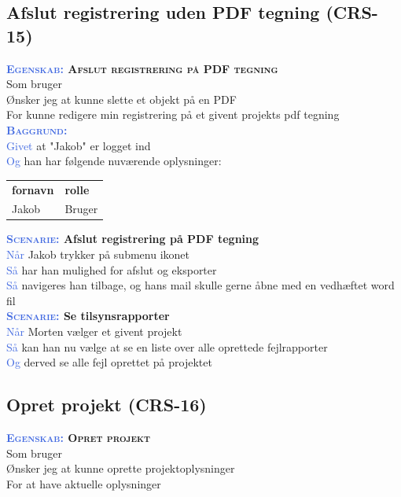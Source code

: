 \subsection{Afslut registrering uden PDF tegning (CRS-15)} \label{sec:USAfslutRegUdenPDF}
\textbf{\textsc{\textcolor{RoyalBlue}{Egenskab:} Afslut registrering på PDF tegning}}\\
Som bruger\\
Ønsker jeg at kunne slette et objekt på en PDF\\
For kunne redigere min registrering på et givent projekts pdf tegning\\

\textsc{\textcolor{RoyalBlue}{\textbf{Baggrund:}}}\\
\textcolor{RoyalBlue}{Givet} at "Jakob" er logget ind\\
\textcolor{RoyalBlue}{Og} han har følgende nuværende oplysninger:\\
\begin{tabular}{| l | l |}
	\textbf{fornavn} & \textbf{rolle} \\
	Jakob & Bruger\\
\end{tabular}

\textbf{\textsc{\textcolor{RoyalBlue}{Scenarie:}} Afslut registrering på PDF tegning}\\
\textcolor{RoyalBlue}{Når} Jakob trykker på submenu ikonet\\
\textcolor{RoyalBlue}{Så}  har han mulighed for afslut og eksporter\\
\textcolor{RoyalBlue}{Så}  navigeres han tilbage, og hans mail skulle gerne åbne med en vedhæftet word fil\\


\textbf{\textsc{\textcolor{RoyalBlue}{Scenarie:}} Se tilsynsrapporter}\\
\textcolor{RoyalBlue}{Når} Morten vælger et givent projekt\\
\textcolor{RoyalBlue}{Så} kan han nu vælge at se en liste over alle oprettede fejlrapporter\\
\textcolor{RoyalBlue}{Og} derved se alle fejl oprettet på projektet\\


\subsection{Opret projekt (CRS-16)} \label{sec:USOpretProjekt}
\textbf{\textsc{\textcolor{RoyalBlue}{Egenskab:} Opret projekt}}\\
Som bruger\\
Ønsker jeg at kunne oprette projektoplysninger\\
For at have aktuelle oplysninger

